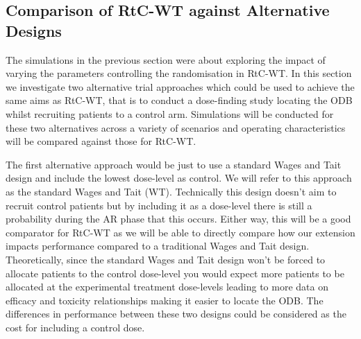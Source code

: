 \subsection{Comparison of RtC-WT against Alternative Designs }
\label{WT:CompAltDesigns}

The simulations in the previous section were about exploring the impact of varying the parameters controlling the randomisation in RtC-WT. In this section we investigate two alternative trial approaches which could be used to achieve the same aims as RtC-WT, that is to conduct a dose-finding study locating the ODB whilst recruiting patients to a control arm. Simulations will be conducted for these two alternatives across a variety of scenarios and operating characteristics will be compared against those for RtC-WT.       

The first alternative approach would be just to use a standard Wages and Tait design and include the lowest dose-level as control. We will refer to this approach as the standard Wages and Tait (WT). Technically this design doesn't aim to recruit control patients but by including it as a dose-level there is still a probability during the AR phase that this occurs. Either way, this will be a good comparator for RtC-WT as we will be able to directly compare how our extension impacts performance compared to a traditional Wages and Tait design. Theoretically, since the standard Wages and Tait design won't be forced to allocate patients to the control dose-level you would expect more patients to be allocated at the experimental treatment dose-levels leading to more data on efficacy and toxicity relationships making it easier to locate the ODB. The differences in performance between these two designs could be considered as the cost for including a control dose. 

